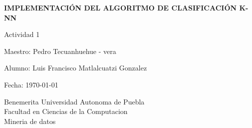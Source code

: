 
\begin{titlepage}
    \begin{center}
        \vspace{1.5cm}

        {\Huge\textbf{IMPLEMENTACIÓN DEL ALGORITMO DE CLASIFICACIÓN K-NN}\par}
        \vspace{1cm}

        {\Large\textcolor{myblue}{Actividad 1}\par}
        \vspace{0.5cm}

        {\Large\textcolor{mygray}{Maestro: Pedro Tecuanhuehue - vera}\par}
        {\Large\textcolor{mygray}{Alumno: Luis Francisco Matlalcuatzi Gonzalez}\par}
        {\Large\textcolor{mygray}{Fecha: \today}\par}

        \vfill

        \textcolor{mygray}{
        \large
        Benemerita Universidad Autonoma de Puebla\\
        Facultad en Ciencias de la Computacion\\
        Mineria de datos\\
        }

    \end{center}
\end{titlepage}
